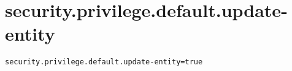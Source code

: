 \section{security.privilege.default.update-entity}
\label{configuration:SecurityPrivilegeDefaultUpdateEntity}
\AvailableInJavaOnly{\TODO}
\begin{lstlisting}[style=Props,caption={Usage example for \textit{security.privilege.default.update-entity}}]
security.privilege.default.update-entity=true
\end{lstlisting}